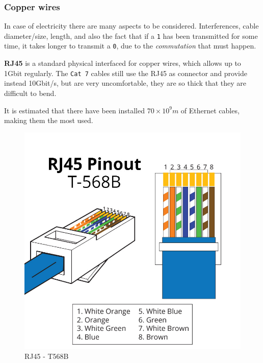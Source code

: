 \subsubsection*{Copper wires}
In case of electricity there are many aspects to be considered. Interferences, cable diameter/size, length, and also the fact that if a \texttt{1} has been transmitted for some time, it takes longer to transmit a \texttt{0}, due to the \textit{commutation} that must happen.
\nl

\begin{paracol}{2}
   \colfill
   \textbf{RJ45} is a standard physical interfaced for copper wires, which allows up to 1Gbit regularly.
   The \texttt{Cat 7} cables still use the RJ45 as connector and provide instead 10Gbit/s, but are very uncomfortable, they are so thick that they are difficult to bend.
   
   It is estimated that there have been installed $70 \times 10^9m$ of Ethernet cables, making them the most used.
   \colfill
   \switchcolumn

   \begin{figure}[htbp]
      \centering
      \includegraphics{images/RJ45_T568B.jpg}
      \caption{RJ45 - T568B}
      \label{fig:RJ45_T568B}
   \end{figure}
\end{paracol}

